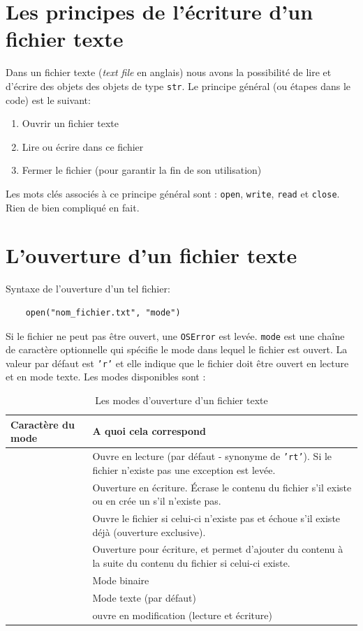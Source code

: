\documentclass[a4paper,12pt]{book}
\begin{document}
\section{Les principes de l'écriture d'un fichier texte}
Dans un fichier texte (\textit{text file} en anglais) nous avons la possibilité de lire et d'écrire des objets des objets de type \texttt{str}.
Le principe général (ou étapes dans le code) est le suivant:
\begin{enumerate}
	\item Ouvrir un fichier texte
	\item Lire ou écrire dans ce fichier
	\item Fermer le fichier (pour garantir la fin de son utilisation)
\end{enumerate}
\medskip

Les mots clés associés à ce principe général sont : \texttt{open}, \texttt{write}, \texttt{read} et \texttt{close}. Rien de bien compliqué en fait.
\medskip

\section{L'ouverture d'un fichier texte}
Syntaxe de l'ouverture d'un tel fichier:
\begin{verbatim}
    open("nom_fichier.txt", "mode")
\end{verbatim}
\medskip

Si le fichier ne peut pas être ouvert, une \texttt{OSError} est levée. \texttt{mode} est une chaîne de caractère optionnelle qui spécifie le mode dans lequel le fichier est ouvert. La valeur par défaut est \texttt{'r'} et elle indique que le fichier doit être ouvert en lecture et en mode texte. Les modes disponibles sont :
\medskip

\begin{table}[h]
\centering
\begin{tabular}{|p{4cm}|p{9cm}|}
\hline
\textbf{Caractère du mode} & \textbf{A quoi cela correspond} \\
\hline
\centering{\texttt{'r'}} & Ouvre en lecture (par défaut - synonyme de \texttt{'rt'}). Si le fichier n'existe pas une exception est levée. \\
\hline
\centering{\texttt{'w'}} & Ouverture en écriture. Écrase le contenu du fichier s'il existe ou en crée un s'il n'existe pas. \\
\hline
\centering{\texttt{'x'}} & Ouvre le fichier si celui-ci n'existe pas et échoue s'il existe déjà (ouverture exclusive). \\
\hline
\centering{\texttt{'a'}} & Ouverture pour écriture, et permet d'ajouter du contenu à la suite du contenu du fichier si celui-ci existe. \\
\hline
\centering{\texttt{'b'}} & Mode binaire \\
\hline
\centering{\texttt{'t'}} & Mode texte (par défaut) \\
\hline
\centering{\texttt{'+'}} & ouvre en modification (lecture et écriture) \\
\hline 
\end{tabular}
\caption{Les modes d'ouverture d'un fichier texte}
\end{table}
\medskip
\end{document}
